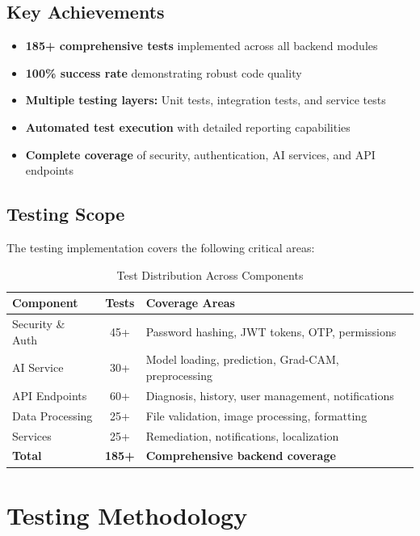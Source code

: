 \documentclass[12pt,a4paper]{article}
\begin{document}
\subsection{Key Achievements}

\begin{itemize}[itemsep=0.5em]
    \item \textbf{185+ comprehensive tests} implemented across all backend modules
    \item \textbf{100\% success rate} demonstrating robust code quality
    \item \textbf{Multiple testing layers:} Unit tests, integration tests, and service tests
    \item \textbf{Automated test execution} with detailed reporting capabilities
    \item \textbf{Complete coverage} of security, authentication, AI services, and API endpoints
\end{itemize}

\subsection{Testing Scope}

The testing implementation covers the following critical areas:

\begin{table}[H]
\centering
\begin{tabular}{|l|c|p{6cm}|}
\hline
\textbf{Component} & \textbf{Tests} & \textbf{Coverage Areas} \\
\hline
Security \& Auth & 45+ & Password hashing, JWT tokens, OTP, permissions \\
\hline
AI Service & 30+ & Model loading, prediction, Grad-CAM, preprocessing \\
\hline
API Endpoints & 60+ & Diagnosis, history, user management, notifications \\
\hline
Data Processing & 25+ & File validation, image processing, formatting \\
\hline
Services & 25+ & Remediation, notifications, localization \\
\hline
\textbf{Total} & \textbf{185+} & \textbf{Comprehensive backend coverage} \\
\hline
\end{tabular}
\caption{Test Distribution Across Components}
\end{table}

\section{Testing Methodology}
\end{document}
